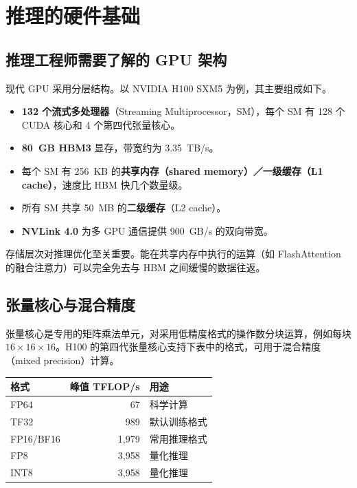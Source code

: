 \chapter{推理的硬件基础}
\label{ch:hardware-foundations}

\section{推理工程师需要了解的 GPU 架构}

现代 GPU 采用分层结构。以 NVIDIA H100 SXM5 为例，其主要组成如下。

\begin{itemize}
  \item \textbf{132 个流式多处理器}（Streaming Multiprocessor，SM），每个 SM 有 128 个 CUDA 核心和 4 个第四代张量核心。
  \item \textbf{80~GB HBM3} 显存，带宽约为 3.35~TB/s。
  \item 每个 SM 有 256~KB 的\textbf{共享内存（shared memory）／一级缓存（L1 cache）}，速度比 HBM 快几个数量级。
  \item 所有 SM 共享 50~MB 的\textbf{二级缓存}（L2 cache）。
  \item \textbf{NVLink 4.0} 为多 GPU 通信提供 900~GB/s 的双向带宽。
\end{itemize}

存储层次对推理优化至关重要。能在共享内存中执行的运算（如 FlashAttention 的融合注意力）可以完全免去与 HBM 之间缓慢的数据往返。

\section{张量核心与混合精度}

张量核心是专用的矩阵乘法单元，对采用低精度格式的操作数分块运算，例如每块 $16\times16\times16$。H100 的第四代张量核心支持下表中的格式，可用于混合精度（mixed precision）计算。

\begin{center}
\begin{tabular}{@{}lrl@{}}
\toprule
\textbf{格式} & \textbf{峰值 TFLOP/s} & \textbf{用途} \\
\midrule
FP64 & 67 & 科学计算 \\
TF32 & 989 & 默认训练格式 \\
FP16/BF16 & 1,979 & 常用推理格式 \\
FP8 & 3,958 & 量化推理 \\
INT8 & 3,958 & 量化推理 \\
\bottomrule
\end{tabular}
\end{center}

